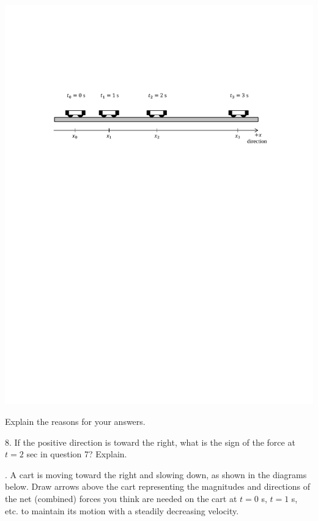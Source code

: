 \vspace{0.3cm}
{\par\centering \includegraphics{force2/carts_speeding_hw1.pdf} \par}
\vspace{0.3cm}

Explain the reasons for your answers.
\answerspace{20mm}

8. If the positive direction is toward the right, what is the sign of the force
at $t = 2$ sec in question 7? Explain.
\answerspace{20mm}

. A cart is moving toward the right and slowing down, as shown in the diagrams
below. Draw arrows above the cart representing the magnitudes and directions
of the net (combined) forces you think are needed on the cart at $t = 0$ s, 
$t
= 1$ s, etc. to maintain its motion with a steadily decreasing velocity.

